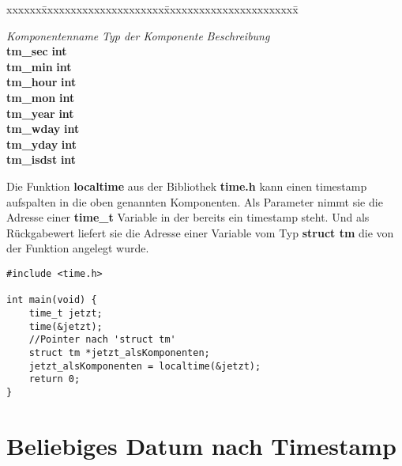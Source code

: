 \documentclass[c_worksheet.tex]{subfiles}
\begin{document}
\begin{tabbing}
xxxxxx\=xxxxxxxxxxxxxxxxxxxxx\=xxxxxxxxxxxxxxxxxxxxxxx\= \kill

\>\textit{Komponentenname} \>\textit{Typ der Komponente} \>\textit{Beschreibung} \\
\>\textbf{ tm\_sec}\> \textbf{ int}\> \\
\>\textbf{ tm\_min}\> \textbf{ int}\> \\
\>\textbf{ tm\_hour}\> \textbf{ int}\> \\
\>\textbf{ tm\_mon}\> \textbf{ int}\> \\
\>\textbf{ tm\_year}\> \textbf{ int}\> \\
\>\textbf{ tm\_wday}\> \textbf{ int}\> \\
\>\textbf{ tm\_yday}\> \textbf{ int}\> \\
\>\textbf{ tm\_isdst}\> \textbf{ int}\> 
\end{tabbing}

Die Funktion \textbf{localtime} aus der Bibliothek \textbf{time.h} kann einen timestamp aufspalten in die oben genannten Komponenten. Als Parameter nimmt sie die Adresse einer \textbf{time\_t} Variable in der bereits ein timestamp steht. Und als Rückgabewert liefert sie die Adresse einer Variable vom Typ \textbf{struct tm} die von der Funktion angelegt wurde.

\begin{lstlisting}
#include <time.h>

int main(void) {
    time_t jetzt;
    time(&jetzt);
    //Pointer nach 'struct tm'
    struct tm *jetzt_alsKomponenten;
    jetzt_alsKomponenten = localtime(&jetzt);
    return 0;
}
\end{lstlisting}

\section{Beliebiges Datum nach Timestamp}
\end{document}
